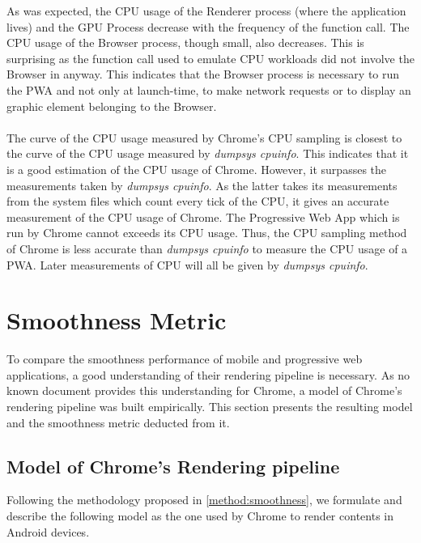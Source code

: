 \documentclass{kththesis}
\begin{document}
As was expected, the CPU usage of the Renderer process (where the application lives) and the GPU Process decrease with the frequency of the function call. The CPU usage of the Browser process, though small, also decreases. This is surprising as the function call used to emulate CPU workloads did not involve the Browser in anyway. This indicates that the Browser process is necessary to run the PWA and not only at launch-time, to make network requests or to display an graphic element belonging to the Browser.

\paragraph{}
The curve of the CPU usage measured by Chrome's CPU sampling is closest to the curve of the CPU usage measured by \textit{dumpsys cpuinfo}. This indicates that it is a good estimation of the CPU usage of Chrome. However, it surpasses the measurements taken by \textit{dumpsys cpuinfo}. As the latter takes its measurements from the system files which count every tick of the CPU, it gives an accurate measurement of the CPU usage of Chrome. The Progressive Web App which is run by Chrome cannot exceeds its CPU usage. Thus, the CPU sampling method of Chrome is less accurate than \textit{dumpsys cpuinfo} to measure the CPU usage of a PWA. Later measurements of CPU will all be given by \textit{dumpsys cpuinfo}.

\section{Smoothness Metric}

To compare the smoothness performance of mobile and progressive web applications, a good understanding of their rendering pipeline is necessary. As no known document provides this understanding for Chrome, a model of Chrome's rendering pipeline was built empirically. This section presents the resulting model and the smoothness metric deducted from it. 

\subsection{Model of Chrome's Rendering pipeline}
\label{results:chrome_model}

Following the methodology proposed in \autoref{method:smoothness}, we formulate and describe the following model as the one used by Chrome to render contents in Android devices.
\end{document}

